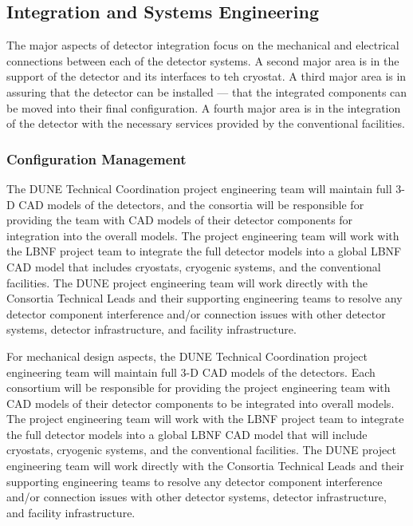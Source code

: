 \subsection{Integration and Systems Engineering }
\label{sec:fdsp-coord-integ-sysengr}

The major aspects of detector integration focus on the mechanical and
electrical connections between each of the detector systems. A second
major area is in the support of the detector and its interfaces to teh
cryostat. A third major area is in assuring that the detector can be
installed --- that the integrated components can be moved into their
final configuration. A fourth major area is in the integration of the
detector with the necessary services provided by the conventional
facilities.

\subsubsection{Configuration Management}
\label{sec:fdsp-coord-integ-config}

The DUNE Technical Coordination project engineering team will maintain
full 3-D CAD models of the detectors, and the consortia will be
responsible for providing the team with CAD models of their detector
components for integration into the overall models.  The project
engineering team will work with the LBNF project team to integrate the
full detector models into a global LBNF CAD model that includes
cryostats, cryogenic systems, and the conventional facilities.  The
DUNE project engineering team will work directly with the Consortia
Technical Leads and their supporting engineering teams to resolve any
detector component interference and/or connection issues with other
detector systems, detector infrastructure, and facility
infrastructure.

For mechanical design aspects, the DUNE Technical Coordination project
engineering team will maintain full 3-D CAD models of the detectors.
Each consortium will be responsible for providing the project
engineering team with CAD models of their detector components to be
integrated into overall models.  The project engineering team will
work with the LBNF project team to integrate the full detector models
into a global LBNF CAD model that will include cryostats, cryogenic
systems, and the conventional facilities.  The DUNE project
engineering team will work directly with the Consortia Technical Leads
and their supporting engineering teams to resolve any detector
component interference and/or connection issues with other detector
systems, detector infrastructure, and facility infrastructure.

